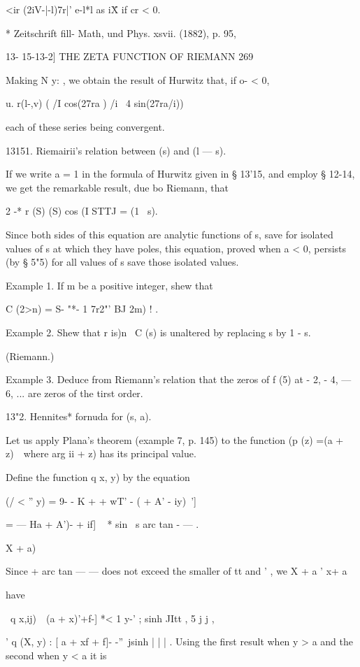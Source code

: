 <ir (2iV-|-l)7r|' e-l*l as i\" X if cr < 0.

* Zeitschrift fill- Math, und Phys. xsvii. (1882), p. 95,



13- 15-13-2] THE ZETA FUNCTION OF RIEMANN 269

Making N y: , we obtain the result of Hurwitz that, if o- < 0,

 u. r(l-,v) ( /I cos(27ra ) /i \ 4 sin(27ra/i))

each of these series being convergent.

13151. Riemairii's relation between (s) and (l — s).

If we write a = 1 in the formula of Hurwitz given in § 13'15, and
employ § 12-14, we get the remarkable result, due bo Riemann, that

2 -* r (S) (S) cos (I STTJ = (1 \ s).

Since both sides of this equation are analytic functions of s, save
for isolated values of s at which they have poles, this equation,
proved when a < 0, persists (by § 5"5) for all values of s save those
isolated values.

Example 1. If m be a positive integer, shew that

C (2>n) = S- "*- 1 7r2"' BJ 2m) ! .

Example 2. Shew that r is)n~ C (s) is unaltered by replacing s by 1 -
s.

(Riemann.)

Example 3. Deduce from Riemann's relation that the zeros of f (5) at -
2, - 4, — 6, ... are zeros of the tirst order.

13"2. Hennites* fornuda for (s, a).

Let us apply Plana's theorem (example 7, p. 145) to the function (p
(z) =(a + z)~\ where arg ii + z) has its principal value.

Define the function q x, y) by the equation

(/ < '' y) = 9- - K + + wT' - ( + A' - iy)~']

= — Ha + A')- + if] ~ * sin \ s arc tan - — .

  X + a)

Since + arc tan — — does not exceed the smaller of tt and ' , we X + a
' x+ a



have



\ q x,ij)\ \ (a + x)'+f-] *< 1 y-' ; sinh JItt , 5 j j ,

' q (X, y) : [ a + xf + f]- -''\ jsinh | | | . Using the first result
when y > a and the second when y < a it is

